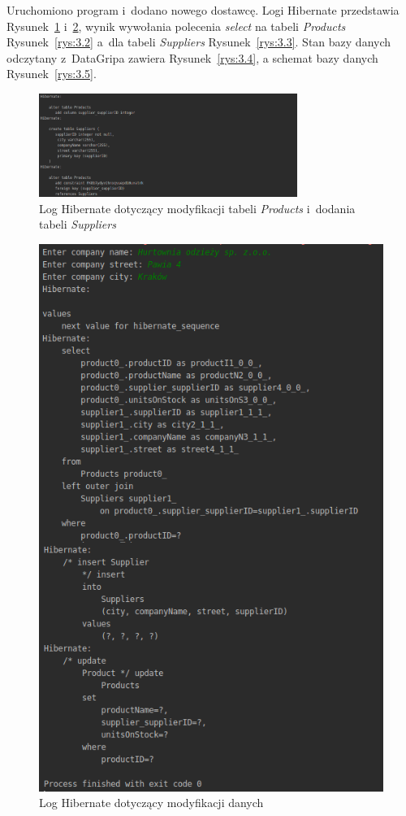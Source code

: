 \documentclass[12pt, a4paper]{mwart}
\begin{document}
Uruchomiono program i~dodano nowego dostawcę. Logi Hibernate przedstawia Rysunek~\ref{rys:3.1a} i~\ref{rys:3.1}, wynik wywołania polecenia \textit{select} na tabeli \textit{Products} Rysunek~\ref{rys:3.2} a~dla tabeli \textit{Suppliers} Rysunek~\ref{rys:3.3}. Stan bazy danych odczytany z~DataGripa zawiera Rysunek~\ref{rys:3.4}, a schemat bazy danych Rysunek~\ref{rys:3.5}.

\begin{figure}[ht]
  \centering
  \includegraphics[width=0.75\textwidth]{III/3-1a.png}
  \caption{Log Hibernate dotyczący modyfikacji tabeli \textit{Products} i~dodania tabeli \textit{Suppliers}}
  \label{rys:3.1a}
\end{figure}

\begin{figure}[ht]
  \centering
  \includegraphics[scale=0.43]{III/3-1.png}
  \caption{Log Hibernate dotyczący modyfikacji danych}
  \label{rys:3.1}
\end{figure}
\end{document}
